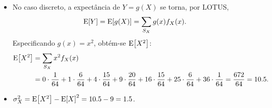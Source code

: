 \begin{itemize}
    \item [h)] 
    No caso discreto, a expectância de $Y=g(X)$ se torna, por LOTUS,
    \begin{equation}
        \mathrm{E}\!\left[Y\right] = \mathrm{E}\!\left[g(X)\right] = \sum_{S_X} g(x) f_X(x).
    \end{equation}
    Especificando $g(x) = x^2$, obtém-se $\mathrm{E}\!\left[X^2\right]$:
    \begin{align}
        \mathrm{E}\!\left[X^2\right] 
        &= \sum_{S_X} x^2 f_X(x) \\
        &= 
        0\cdot \frac{1}{64} +
        1\cdot \frac{6}{64} +
        4\cdot \frac{15}{64} +
        9\cdot \frac{20}{64} +
        16\cdot \frac{15}{64} +
        25\cdot \frac{6}{64} +
        36\cdot \frac{1}{64}
        =
        \frac{672}{64}
        =
        10.5.
    \end{align}
    
    \item [i)] $\sigma_X^2 = \mathrm{E}\!\left[X^2\right] - \mathrm{E}\!\left[X\right]^2 = 10.5 - 9 = 1.5$.
\end{itemize}